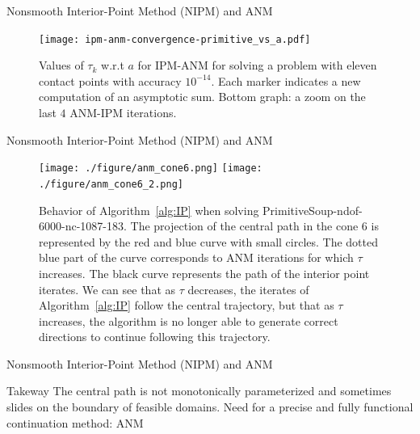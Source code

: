 \begin{frame}{Nonsmooth Interior-Point Method (NIPM) and ANM}
\begin{figure}[htbp]
  \begin{center}
    \texttt{[image: ipm-anm-convergence-primitive\_vs\_a.pdf]}
\caption{Values of $\tau_k$ w.r.t $a$ for IPM-ANM for solving a problem with eleven contact points with accuracy $10^{-14}$. Each marker indicates a new computation of an asymptotic sum. Bottom graph: a zoom on the last $4$ ANM-IPM iterations.}
\label{tau2t_vs_a}
\end{center}
\end{figure}
\end{frame}
\begin{frame}{Nonsmooth Interior-Point Method (NIPM) and ANM}
  \begin{figure}[htbp]
  \begin{center}
    \texttt{[image: ./figure/anm\_cone6.png]}
    \texttt{[image: ./figure/anm\_cone6\_2.png]}
\caption{Behavior of Algorithm~\ref{alg:IP} when solving PrimitiveSoup-ndof-6000-nc-1087-183. The projection of the central path in the cone 6 is represented by the red and blue curve with small circles. The dotted blue part of the curve corresponds to ANM iterations for which $\tau$ increases. The black curve represents the path of the interior point iterates. We can see that as $\tau$ decreases, the iterates of Algorithm~\ref{alg:IP} follow the central trajectory, but that as $\tau$ increases, the algorithm is no longer able to generate correct directions to continue following this trajectory.}
\label{anm_cone6}
\end{center}
\end{figure}
\end{frame}
\begin{frame}{Nonsmooth Interior-Point Method (NIPM) and ANM}
\begin{block}{Takeway}
  The central path is not monotonically parameterized and sometimes slides on the boundary of feasible domains.
   Need for a precise and fully functional continuation method: ANM
\end{block}
\end{frame}



